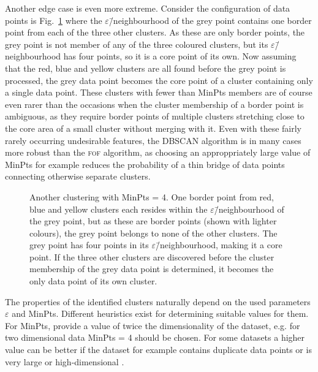 \documentclass[english, oneside]{HYgradu}
\begin{document}
Another edge case is even more extreme. Consider the configuration of data points is Fig.\ \ref{fig:DBSCAN-singlecore} where the $\varepsilon$\=/neighbourhood of the grey point contains one border point from each of the three other clusters. As these are only border points, the grey point is not member of any of the three coloured clusters, but its $\varepsilon$\=/neighbourhood has four points, so it is a core point of its own. Now assuming that the red, blue and yellow clusters are all found before the grey point is processed, the grey data point becomes the core point of a cluster containing only a single data point. These clusters with fewer than MinPts members are of course even rarer than the occasions when the cluster membership of a border point is ambiguous, as they require border points of multiple clusters stretching close to the core area of a small cluster without merging with it. Even with these fairly rarely occurring undesirable features, the DBSCAN algorithm is in many cases more robust than the \textsc{fof} algorithm, as choosing an approppriately large value of MinPts for example reduces the probability of a thin bridge of data points connecting otherwise separate clusters.

\begin{figure}
    \centering
    
    \caption{Another clustering with MinPts = 4. One border point from red, blue and yellow clusters each resides within the $\varepsilon$\=/neighbourhood of the grey point, but as these are border points (shown with lighter colours), the grey point belongs to none of the other clusters. The grey point has four points in its $\varepsilon$\=/neighbourhood, making it a core point. If the three other clusters are discovered before the cluster membership of the grey data point is determined, it becomes the only data point of its own cluster.}\label{fig:DBSCAN-singlecore}
\end{figure}

The properties of the identified clusters naturally depend on the used parameters $\varepsilon$ and MinPts. Different heuristics exist for determining suitable values for them. For MinPts, \citet{schubert2017dbscan} provide a value of twice the dimensionality of the dataset, e.g. for two dimensional data MinPts = 4 should be chosen. For some datasets a higher value can be better if the dataset for example contains duplicate data points or is very large or high-dimensional \citep{schubert2017dbscan}.
\end{document}
